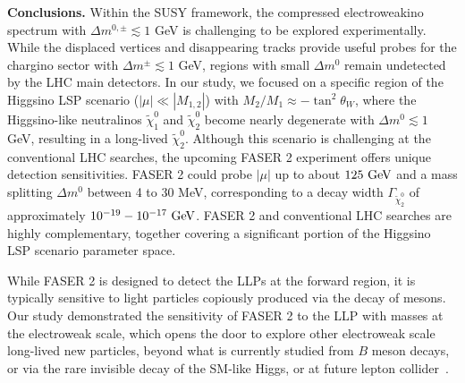 \documentclass[
    twocolumn,
    superscriptaddress,
    amsmath, 
    amssymb,
    aps,
    reprint,
    floatfix
]{revtex4-2}
\newcommand{\Wei}[1]{\textcolor{green2} {Wei: #1}}
\begin{document}
\vspace{0.5em}\noindent
\textbf{Conclusions.}
\label{sec:sum}
Within the SUSY framework, the compressed electroweakino spectrum  with $\Delta m^{0,\pm}\lesssim 1$ GeV is challenging to be explored experimentally. While the displaced vertices and disappearing tracks provide useful probes for the chargino  sector with $\Delta m^\pm \lesssim 1 $ GeV, regions with small $\Delta m^0$ remain undetected by the LHC main detectors.
In our study, we focused on a specific region of the Higgsino LSP scenario ($|\mu| \ll |M_{1,2}|$) with $M_2/M_1 \approx -\tan^2{\theta_W}$, where the Higgsino-like neutralinos $\tilde{\chi}_1^0$ and $\tilde{\chi}_2^0$ become nearly degenerate with $\Delta m^0 \lesssim 1$ GeV, resulting in a long-lived $\tilde{\chi}_2^0$. Although this scenario is challenging at the conventional LHC searches, the upcoming FASER 2 experiment offers unique detection sensitivities. FASER 2 could probe $|\mu|$ up to about $125~{\rm GeV}$ and a mass splitting $\Delta m^0$ between 4 to 30 MeV, corresponding to a decay width $\Gamma_{\tilde{\chi}_2^0}$ of approximately $10^{-19} - 10^{-17}~{\rm GeV}$. FASER 2 and conventional LHC searches are highly complementary, together covering a significant portion of the Higgsino LSP scenario parameter space.






While FASER 2 is designed to detect the LLPs at the forward region, it is typically sensitive to light particles copiously produced via the decay of mesons.
Our study demonstrated the sensitivity of FASER 2 to the LLP with masses at the electroweak scale, which opens the door to explore other electroweak scale long-lived new particles, beyond what is currently studied from $B$ meson decays, or via the rare invisible decay of the SM-like Higgs, or at future lepton collider~\cite{Blondel:2022qqo}. 
\end{document}
